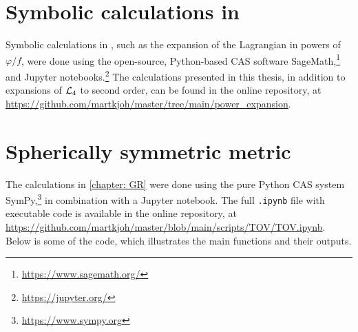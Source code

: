  

\section{Symbolic calculations in \chpt}
\label{section: symbolic calculations}

Symbolic calculations in \chpt, such as the expansion of the Lagrangian in powers of $\varphi/f$, were done using the open-source, Python-based CAS software SageMath,\footnote{\url{https://www.sagemath.org/}} and Jupyter notebooks.\footnote{\url{https://jupyter.org/}}
The calculations presented in this thesis, in addition to expansions of $\mathcal{L}_4$ to second order, can be found in the online repository, at \url{https://github.com/martkjoh/master/tree/main/power_expansion}.



\section{Spherically symmetric metric}

The calculations in \autoref{chapter: GR} were done using the pure Python CAS system SymPy,\footnote{\url{https://www.sympy.org}} in combination with a Jupyter notebook.
The full \texttt{.ipynb} file with executable code is available in the online repository, at \url{https://github.com/martkjoh/master/blob/main/scripts/TOV/TOV.ipynb}.
Below is some of the code, which illustrates the main functions and their outputs.





